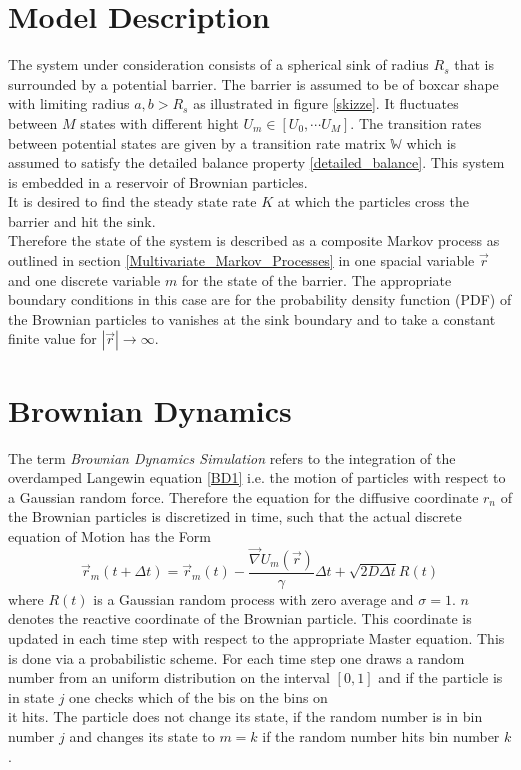 \section{Model Description}
\label{Model_Description}
The system under consideration consists of a spherical sink of radius $R_s$ that is surrounded by a potential barrier. The barrier is assumed to be of boxcar shape with limiting radius $a,b>R_s$ as illustrated in figure \ref{skizze}. It fluctuates between $M$ states with different hight $U_m \in [U_0, \cdots U_M]$. The transition rates between potential states are given by a transition rate matrix $\mathbb{W}$ which is assumed to satisfy the detailed balance property \eqref{detailed_balance}. This system is embedded in a reservoir of Brownian particles. \\
It is desired to find the steady state rate $K$ at which the particles cross the barrier and hit the sink.\\
Therefore the state of the system is described as a composite Markov process as outlined in section \ref{Multivariate_Markov_Processes} in one spacial variable $\vec{r}$ and one discrete variable $m$ for the state of the barrier.
The appropriate boundary conditions in this case are for the probability density function (PDF) of the Brownian particles to vanishes at the sink boundary and to take a constant finite value for $|\vec{r}| \rightarrow \infty$. \\
\section{Brownian Dynamics}
\label{BDsim}
The term \textit{Brownian Dynamics Simulation} refers to the integration of the overdamped Langewin equation \eqref{BD1} i.e. the motion of particles with respect to a Gaussian random force. Therefore the equation for the diffusive coordinate $r_n$ of the Brownian particles is discretized in time, such that the actual discrete equation of Motion has the Form
\begin{equation}
    \vec r_m(t + \Delta t) = \vec r_m(t) - \frac{\vec \nabla U_m(\vec r)}{\gamma}\Delta t + \sqrt{2 D \Delta t} R(t)
    \label{discrete_eqm}
\end{equation}
where $R(t)$ is a Gaussian random process with zero average and $\sigma = 1$. $n$ denotes the reactive coordinate of the Brownian particle. This coordinate is updated in each time step with respect to the appropriate Master equation. This is done via a probabilistic scheme. For each time step one draws a random number from an uniform distribution on the interval $[0,1]$ and if the particle is in state $j$ one checks which of the bis on the bins on 
\begin{equation}
    [W_{1,j}, \cdots , W_{j-1,j},1 - \sum_{i \ne j} W_{i,j}, W_{j+1,j}, \cdots , W_{M,j}]
    \label{num_meq}
\end{equation}
it hits. The particle does not change its state, if the random number is in bin number $j$ and changes its state to $m = k$ if the random number hits bin number $k$.\\

